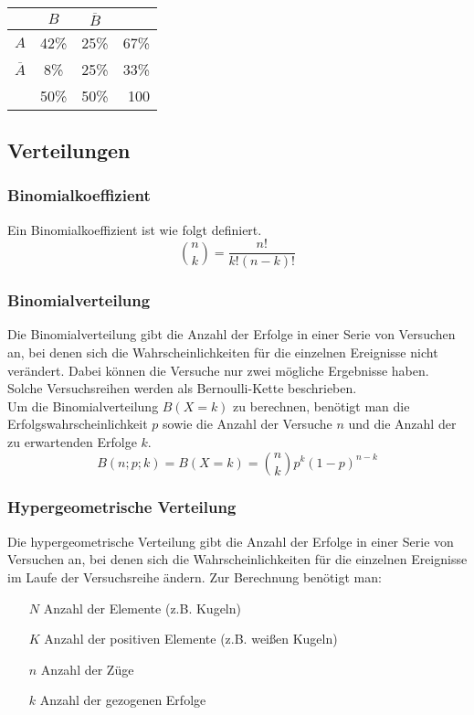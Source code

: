 \documentclass[a4paper]{article}
\begin{document}
			\setlength{\tabcolsep}{10pt}
			\renewcommand{\arraystretch}{1.5}
			\begin{center}
				\begin{tabular}{ l | c | c | r }
									& $B$ 	& $\overline{B}$ 	& 		\\ \hline
					$A$ 			& 42\% 	& 25\% 				& 67\%	\\ \hline
					$\overline{A}$ 	& 8\% 	& 25\%				& 33\% 	\\ \hline
					& 50\% 	& 50\% 				& 100
				\end{tabular}
			\end{center}
		\subsection{Verteilungen}
			\subsubsection{Binomialkoeffizient}
				Ein Binomialkoeffizient ist wie folgt definiert.
				\begin{equation}
					\binom{n}{k} = \frac{n!}{k! (n-k)!}
				\end{equation}
			\subsubsection{Binomialverteilung}
				Die Binomialverteilung gibt die Anzahl der Erfolge in einer Serie von Versuchen an, bei denen sich die Wahrscheinlichkeiten für die einzelnen Ereignisse nicht verändert. Dabei können die Versuche nur zwei mögliche Ergebnisse haben. Solche Versuchsreihen werden als Bernoulli-Kette beschrieben.\\
				Um die Binomialverteilung $B(X = k)$ zu berechnen, benötigt man die Erfolgswahrscheinlichkeit $p$ sowie die Anzahl der Versuche $n$ und die Anzahl der zu erwartenden Erfolge $k$.
				\begin{equation}
					B(n; p; k) = B(X = k) = \binom{n}{k} p^k (1 - p)^{n-k}
				\end{equation}
			\subsubsection{Hypergeometrische Verteilung}
				Die hypergeometrische Verteilung gibt die Anzahl der Erfolge in einer Serie von Versuchen an, bei denen sich die Wahrscheinlichkeiten für die einzelnen Ereignisse im Laufe der Versuchsreihe ändern. Zur Berechnung benötigt man:
				\begin{itemize}
					\item[$N$] Anzahl der Elemente (z.B. Kugeln)
					\item[$K$] Anzahl der positiven Elemente (z.B. weißen Kugeln)
					\item[$n$] Anzahl der Züge
					\item[$k$] Anzahl der gezogenen Erfolge
				\end{itemize}
				
\end{document}
